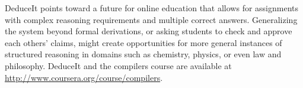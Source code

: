 \documentclass{sigchi}
\newcommand{\msb}[1]{\textbf{\textcolor{cyan}{Michael: #1}}}
\begin{document}
DeduceIt points toward a future for online education that allows for assignments with complex reasoning requirements and multiple correct answers. Generalizing the system beyond formal derivations, or asking students to check and approve each others' claims, might create opportunities for more general instances of structured reasoning in domains such as chemistry, physics, or even law and philosophy. DeduceIt and the compilers course are available at \url{http://www.coursera.org/course/compilers}.


% 

\balance

\small


\end{document}
